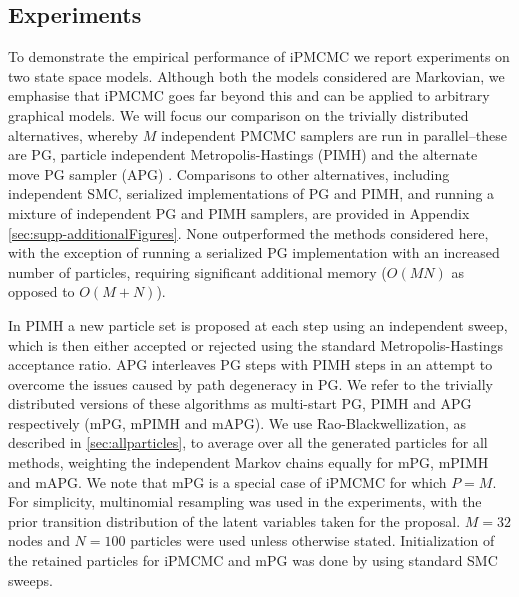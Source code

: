 
\subsection{Experiments}
\label{sec:experiments}

To demonstrate the %
empirical performance of iPMCMC we report experiments on two state space models.  
Although both the models considered are Markovian, we emphasise that iPMCMC goes far beyond this and can be applied to arbitrary graphical models. 
We will focus our comparison on the trivially distributed alternatives, whereby $M$ independent PMCMC samplers are run in parallel--these are PG, particle independent Metropolis-Hastings (PIMH) \cite{andrieuDH2010} and the alternate move PG sampler (APG) \cite{holenstein2009particle}. Comparisons to other alternatives, including independent SMC, serialized implementations of PG and PIMH, and running a mixture of independent PG and PIMH samplers, are provided in Appendix \ref{sec:supp-additionalFigures}.  None outperformed the methods considered here, with the exception of running a serialized PG implementation with an increased number of particles, requiring significant additional memory ($O(MN)$ as opposed to $O(M+N)$).

In PIMH a new particle set is proposed at each \mcmc step using an independent \smc sweep, which is then either accepted or rejected using the standard Metropolis-Hastings acceptance ratio. %
APG interleaves PG steps with PIMH steps
in an attempt to overcome the issues caused by path degeneracy in PG.  We refer to the trivially distributed versions of these algorithms as multi-start PG, PIMH and APG respectively (mPG, mPIMH and mAPG). 
We use Rao-Blackwellization, as described in \ref{sec:allparticles}, to average over all the generated particles for all methods, weighting the independent Markov chains equally for mPG, mPIMH and mAPG. We note that mPG is a special case of iPMCMC for which $P=M$.  For simplicity, multinomial resampling was used in the experiments, with the prior transition distribution of the latent variables taken for the proposal.  $M=32$ nodes and $N=100$ particles were used unless otherwise stated.  Initialization of the retained particles for iPMCMC and mPG was done by using standard SMC sweeps.

